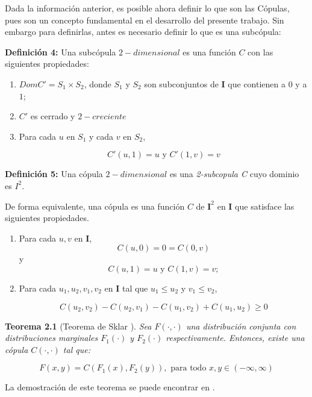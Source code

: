 Dada la información anterior, es posible ahora definir lo que son las Cópulas, pues son un concepto fundamental en el desarrollo del presente trabajo. Sin embargo para definirlas, antes es necesario definir lo que es una subcópula: 


\textbf{Definición 4:} Una subcópula $2-dimensional$ es una función $C$ con las siguientes propiedades:

\begin{enumerate}
    \item $DomC'=S_1 \times S_2$, donde $S_1$ y $S_2$ son subconjuntos de $\textbf{I}$ que contienen a $0$ y a $1$;
    \item $C'$ es cerrado y $2-creciente$
    
    \item Para cada $u$ en $S_1$ y cada $v$ en $S_2$,
    
    $$C'(u,1)=u \text{ y } C'(1,v)=v$$
\end{enumerate}

\textbf{Definición 5:} Una cópula $2-dimensional$ es una \textit{2-subcopula C} cuyo dominio es \textbf{${I}^2$}. 

De forma equivalente, una cópula es una función $C$ de $\textbf{I}^2$ en $\textbf{I}$ que satisface las siguientes propiedades. 

\begin{enumerate}
    \item Para cada $u, v$ en $\textbf{I}$, 
    $$C(u,0)=0=C(0,v) $$
    y
    $$C(u,1)=u \text{ y } C(1,v)=v; $$ 
    
    \item Para cada $u_1, u_2, v_1, v_2 $ en $\textbf{I}$ tal que $u_1 \leq u_2$ y $v_1 \leq v_2$,
    
    $$C(u_2,v_2)-C(u_2,v_1)-C(u_1,v_2)+C(u_1,u_2)\geq 0  $$
    
\end{enumerate}


\textbf{Teorema 2.1} (Teorema de Sklar \cite{sklar}).
\textit{Sea $F(\cdot,\cdot)$ una distribución conjunta con distribuciones marginales $F_1(\cdot)$ y $F_2(\cdot)$ respectivamente. Entonces, existe una cópula $C(\cdot,\cdot)$ tal que: }


\begin{equation}
F(x,y)=C(F_1(x),F_2(y)),\text{ para todo }x,y \in (-\infty,\infty)
\label{teosklar}
\end{equation}

La demostración de este teorema se puede encontrar en \cite{sklar}. 

